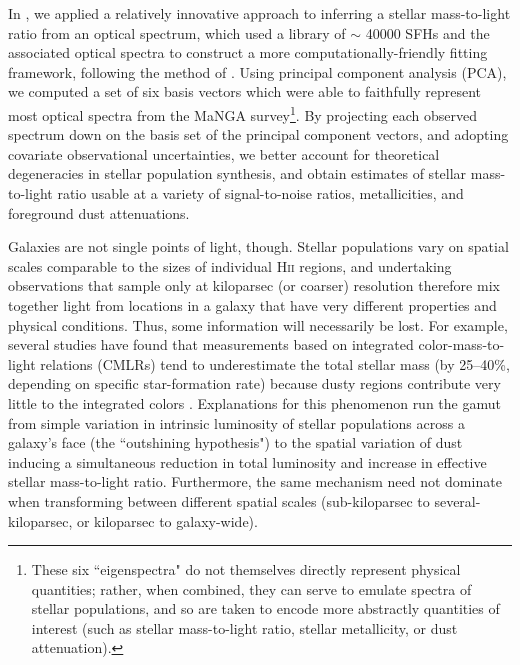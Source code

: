 In \citet[][hereafter ]{pace_19a_pca}, we applied a relatively innovative approach to inferring a stellar mass-to-light ratio from an optical spectrum, which used a library of $\sim$ 40000 SFHs and the associated optical spectra to construct a more computationally-friendly fitting framework, following the method of \citet[][, hereafter ]{chen_pca}. Using principal component analysis (PCA), we computed a set of six basis vectors which were able to faithfully represent most optical spectra from the MaNGA survey\footnote{These six ``eigenspectra" do not themselves directly represent physical quantities; rather, when combined, they can serve to emulate spectra of stellar populations, and so are taken to encode more abstractly quantities of interest (such as stellar mass-to-light ratio, stellar metallicity, or dust attenuation).}. By projecting each observed spectrum down on the basis set of the principal component vectors, and adopting covariate observational uncertainties, we better account for theoretical degeneracies in stellar population synthesis, and obtain estimates of stellar mass-to-light ratio usable at a variety of signal-to-noise ratios, metallicities, and foreground dust attenuations.

Galaxies are not single points of light, though. Stellar populations vary on spatial scales comparable to the sizes of individual H\textsc{ii} regions, and undertaking observations that sample only at kiloparsec (or coarser) resolution therefore mix together light from locations in a galaxy that have very different properties and physical conditions. Thus, some information will necessarily be lost. For example, several studies have found that measurements based on integrated color-mass-to-light relations (CMLRs) tend to underestimate the total stellar mass (by 25--40\%, depending on specific star-formation rate) because dusty regions contribute very little to the integrated colors \citep{zibetti_2009,sorba_sawicki_15,martinez-garcia_17}. Explanations for this phenomenon run the gamut from simple variation in intrinsic luminosity of stellar populations across a galaxy's face (the ``outshining hypothesis") to the spatial variation of dust inducing a simultaneous reduction in total luminosity and increase in effective stellar mass-to-light ratio. Furthermore, the same mechanism need not dominate when transforming between different spatial scales (sub-kiloparsec to several-kiloparsec, or kiloparsec to galaxy-wide).

